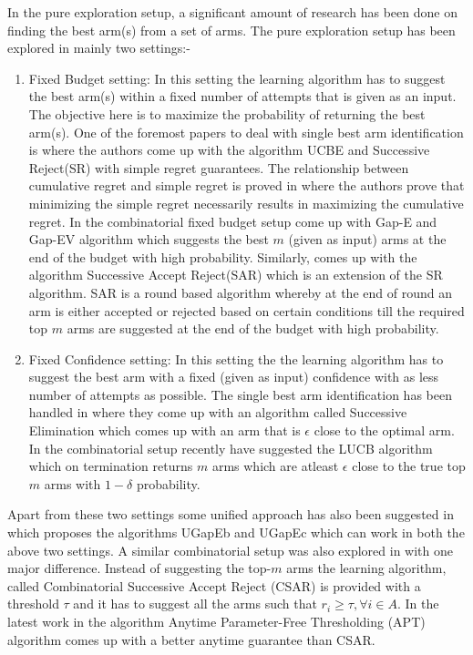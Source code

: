 	In the pure exploration setup, a significant amount of research has been done on finding the best arm(s) from a set of arms. The pure exploration setup has been explored in mainly two settings:-
\begin{enumerate}
\item Fixed Budget setting: In this setting the learning algorithm has to suggest the best arm(s) within a fixed number of attempts that is given as an input. The objective here is to maximize the probability of returning the best arm(s). One of the foremost papers to deal with single best arm identification is \cite{audibert2009exploration} where the authors come up with the algorithm UCBE and Successive Reject(SR) with simple regret guarantees. The relationship between cumulative regret and simple regret is proved in \cite{bubeck2011pure} where the authors prove that minimizing the simple regret necessarily results in maximizing the cumulative regret. In the combinatorial fixed budget setup \cite{gabillon2011multi} come up with Gap-E and Gap-EV algorithm which suggests the best $m$ (given as input) arms at the end of the budget with high probability. Similarly, \cite{bubeck2013multiple} comes up with the algorithm Successive Accept Reject(SAR) which is an extension of the SR algorithm. SAR is a round based algorithm whereby at the end of round an arm is either accepted or rejected based on certain conditions till the required top $m$ arms are suggested at the end of the budget with high probability. 
\item Fixed Confidence setting: In this setting the the learning algorithm has to suggest the best arm with a fixed (given as input) confidence with as less number of attempts as possible. The single best arm identification has been handled in \cite{even2006action} where they come up with an algorithm called Successive Elimination which comes up with an arm that is $\epsilon$ close to the optimal arm. In the combinatorial setup recently \cite{kalyanakrishnan2012pac} have suggested the LUCB algorithm which on termination returns $m$ arms which are atleast $\epsilon$ close to the true top $m$ arms with $1-\delta$ probability.
\end{enumerate}	

	Apart from these two settings some unified approach has also been suggested in \cite{gabillon2012best} which proposes the algorithms UGapEb and UGapEc which can work in both the above two settings. A similar combinatorial setup was also explored in \cite{chen2014combinatorial} with one major difference. Instead of suggesting the top-$m$ arms the learning algorithm, called Combinatorial Successive Accept Reject (CSAR) is provided with a threshold $\tau$ and it has to suggest all the arms such that $r_{i}\geq \tau, \forall i\in A$. In the latest work in \cite{locatelli2016optimal} the algorithm Anytime Parameter-Free Thresholding (APT) algorithm comes up with a better anytime guarantee than CSAR.  



